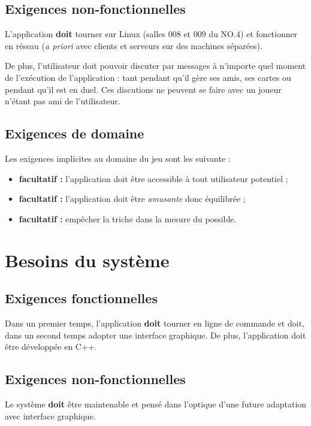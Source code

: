 \documentclass{article}
\begin{document}
    \subsection{Exigences non-fonctionnelles}
        L'application \textbf{doit} tourner sur Linux (salles 008 et 009 du NO.4) et fonctionner en réseau (\textit{a priori} avec clients
        et serveurs sur des machines séparées).

        De plus, l'utilisateur doit pouvoir discuter par messages à n'importe quel moment de l'exécution de l'application : tant pendant
        qu'il gère ses amis, ses cartes ou pendant qu'il est en \gls{duel}. Ces discutions ne peuvent se faire avec un joueur
        n'étant pas ami de l'utilisateur.

    \subsection{Exigences de domaine}
        Les exigences implicites au domaine du jeu sont les suivante :

        \begin{itemize}
            \item \textbf{\gls{facultatif} : } l'application doit être accessible à tout utilisateur potentiel ;
            \item \textbf{\gls{facultatif} : } l'application doit être \textit{amusante} donc équilibrée ;
            \item \textbf{\gls{facultatif} : } empêcher la triche dans la mesure du possible.
        \end{itemize}

\section{Besoins du système}
    \subsection{Exigences fonctionnelles}
        Dans un premier temps, l'application \textbf{doit} tourner en ligne de commande et doit, dans un second temps adopter une interface
        graphique. De plus, l'application doit être développée en C++.

    \subsection{Exigences non-fonctionnelles}
        Le système \textbf{doit} être maintenable et pensé dans l'optique d'une future adaptation avec interface graphique.
\end{document}
